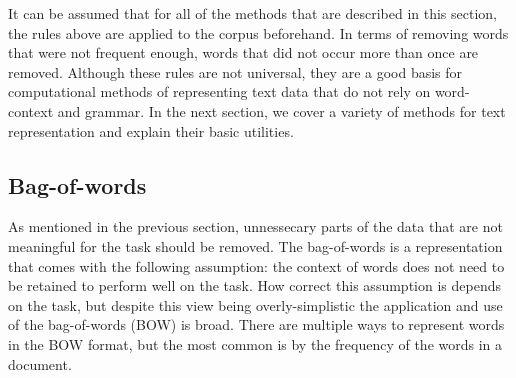 
It can be assumed that for all of the methods that are described in this section, the  rules above are applied to the corpus beforehand. In terms of removing words that were not frequent enough, words that did not occur more than once are removed.  Although these rules are not universal, they are a good basis for computational methods of representing text data that do not rely on word-context and grammar. In the next section, we cover a variety of methods for text representation and explain their basic utilities.  %






\subsection{Bag-of-words}\label{bg:BOW}

As mentioned in the previous section, unnessecary parts of the data that are not  meaningful for the task should be removed. The bag-of-words is a representation that comes with the following assumption: the context of words does not need to be retained to perform well on the task. How correct this assumption is depends on the task, but despite this view being overly-simplistic the application and use of the bag-of-words (BOW) is broad. There are multiple ways to represent words in the BOW format, but the most common is by the frequency of the words in a document.

